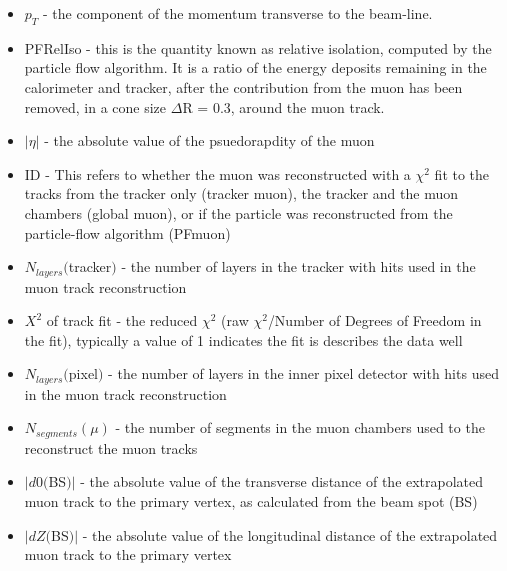 \begin{itemize}
  \item $p_{T}$ - the component of the momentum transverse to the
    beam-line.
  \item PFRelIso - this is the quantity known as relative isolation,
     computed by the particle flow algorithm.  It is a ratio of the
     energy deposits remaining in the calorimeter and tracker, after
     the contribution from the muon has been removed, in a cone size
     $\Delta$R = 0.3, around the muon track.
  \item $|\eta|$ - the absolute value of the psuedorapdity of the muon
  \item ID - This refers to whether the muon was reconstructed with a
    $\chi^{2}$ fit to the tracks from the tracker only (tracker muon),
    the tracker and the muon chambers (global muon), or if the
    particle was reconstructed from the particle-flow algorithm
    (PFmuon)
  \item $N_{layers}($tracker$)$ - the number of layers in the tracker
    with hits used in the muon track reconstruction
  \item ${X}^{2}$ of track fit - the reduced $\chi^{2}$ (raw
    $\chi^{2}$/Number of Degrees of Freedom in the fit), typically a
    value of 1 indicates the fit is describes the data well 
  \item $N_{layers}($pixel$)$ - the number of layers in the inner
    pixel detector with hits used in the muon track reconstruction
  \item $N_{segments}(\mu)$ - the number of segments in the muon
    chambers used to the reconstruct the muon tracks
  \item $|d0($BS$)|$ - the absolute value of the transverse distance
    of the extrapolated muon track to the primary vertex, as
    calculated from the beam spot (BS)
  \item $|dZ($BS$)|$ - the absolute value of the longitudinal distance
    of the extrapolated muon track to the primary vertex
\end{itemize}

